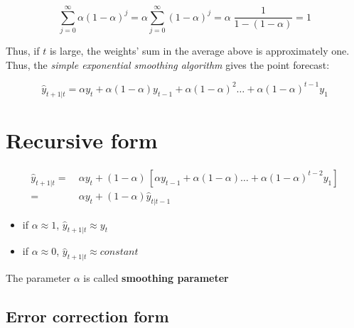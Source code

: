 \documentclass[dvipsnames,12pt]{book}
\begin{document}
            \begin{equation}
                \sum_{j=0}^\infty \alpha (1-\alpha)^j = \alpha \sum_{j=0}^\infty  (1-\alpha)^j = \alpha \; \frac{1}{1- (1 - \alpha)} = 1
            \end{equation}

            Thus, if $t$ is large, the weights' sum in the average above is approximately one. \\

            Thus, the \textit{simple exponential smoothing algorithm} gives the point forecast:

            \begin{equation}
                \hat{y}_{t+1|t} = \alpha y_t + \alpha (1-\alpha) y_{t-1} + \alpha (1-\alpha)^2 \ldots +  \alpha (1-\alpha)^{t-1} y_1
            \end{equation}

        \section{Recursive form}

            \begin{align}
                \hat{y}_{t+1 | t} = & \ \alpha y_t + (1-\alpha) \, [\alpha  y_{t-1} + \alpha (1-\alpha) \ldots +  \alpha (1-\alpha)^{t-2} y_1] \\
                = & \ \alpha y_t + (1-\alpha) \hat{y}_{t | t-1}
            \end{align} 

            \begin{remark}
                \begin{itemize}
                    \item if $\alpha \approx 1$,  $\hat{y}_{t+1|t} \approx y_t$ 
                    \item if $\alpha \approx 0$,  $\hat{y}_{t+1|t} \approx constant$
                \end{itemize}
            \end{remark}

            \begin{definition}
                The parameter $\alpha$ is called \textbf{smoothing parameter}
            \end{definition}

            \subsection{Error correction form}
    
\end{document}
